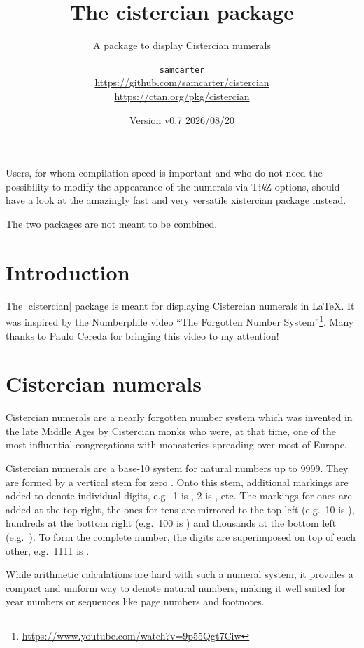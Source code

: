 \documentclass{scrartcl}
\title{The cistercian package}
\subtitle{A package to display Cistercian numerals}
\author{%
  \texorpdfstring{
    \texttt{samcarter}\\
    \url{https://github.com/samcarter/cistercian}\\
    \url{https://ctan.org/pkg/cistercian}
  }{samcarter}}
\date{Version v0.7 \textendash{} 2026/08/20}
\begin{document}
\maketitle
\thispagestyle{scrheadings}

\begin{tcolorbox}[width=.8\textwidth,center,sidebyside=false,title={Note}]
Users, for whom compilation speed is important and who do not need the possibility to modify the appearance of the numerals via Ti\emph{k}Z options, should have a look at the amazingly fast and very versatile \href{https://ctan.org/pkg/xistercian}{xistercian} package instead.

The two packages are not meant to be combined.
\end{tcolorbox}

\section{Introduction}

The \saminline|cistercian| package is meant for displaying Cistercian numerals in \LaTeX{}.
It was inspired by the Numberphile video ``The Forgotten Number System''\footnote{\url{https://www.youtube.com/watch?v=9p55Qgt7Ciw}}. Many thanks to Paulo Cereda for bringing this video to my attention!

\blurb

\section{Cistercian numerals}

Cistercian numerals are a nearly forgotten number system which was invented in the late Middle Ages by Cistercian monks who were, at that time, one of the most influential congregations with monasteries spreading over most of Europe.

Cistercian numerals are a base-10 system for natural numbers up to 9999.
They are formed by a vertical stem for zero .
Onto this stem, additional markings are added to denote individual digits, e.g.\ 1 is , 2 is , etc.
The markings for ones are added at the top right, the ones for tens are mirrored to the top left (e.g.\ 10 is ), hundreds at the bottom right (e.g.\ 100 is ) and thousands at the bottom left (e.g.\ ).
To form the complete number, the digits are superimposed on top of each other, e.g.\ 1111 is .

While arithmetic calculations are hard with such a numeral system, it provides a compact and uniform way to denote natural numbers, making it well suited for year numbers or sequences like page numbers and footnotes.
\end{document}
